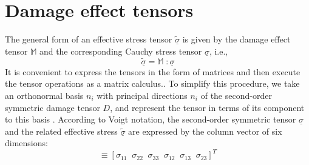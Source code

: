 \documentclass[12pt,a4paper,twoside,openright]{report}
\begin{document}
\section{Damage effect tensors}\label{Matrix Representation of Damage effect tensors}
\indent\indent\indent The general form of an effective stress tensor $\underline{\tilde{\sigma}}$ is given by the damage effect tensor $\mathbb{M}$ and the corresponding Cauchy stress tensor $\underline{\sigma}$, i.e.,
\begin{equation}
\underline{\tilde{\sigma}}  = \mathbb{M} \; :  \underline{\sigma}
\label{eqn:effective_stress_tensor} 
\end{equation}
It is convenient to express the tensors in the form of matrices and then execute the tensor operations as a matrix calculus.. To simplify this procedure, we take an orthonormal basis ${n_{i}}$ with principal directions $n_{i}$ of the second-order symmetric damage tensor $D$, and represent the tensor in terms of its component to this basis \citep{murakami2012continuum}. According to Voigt notation, the second-order symmetric tensor $\underline{\sigma}$ and the related effective stress $\underline{\tilde{\sigma}}$ are expressed by the column vector of six dimensions:
\begin{equation}
   [\sigma_{P}]  \equiv  [\sigma_{11} \;\; \sigma_{22} \;\;\sigma_{33} \;\;\sigma_{12} \;\;\sigma_{13} \;\;\sigma_{23} ]^{T}
\end{equation}
\end{document}
